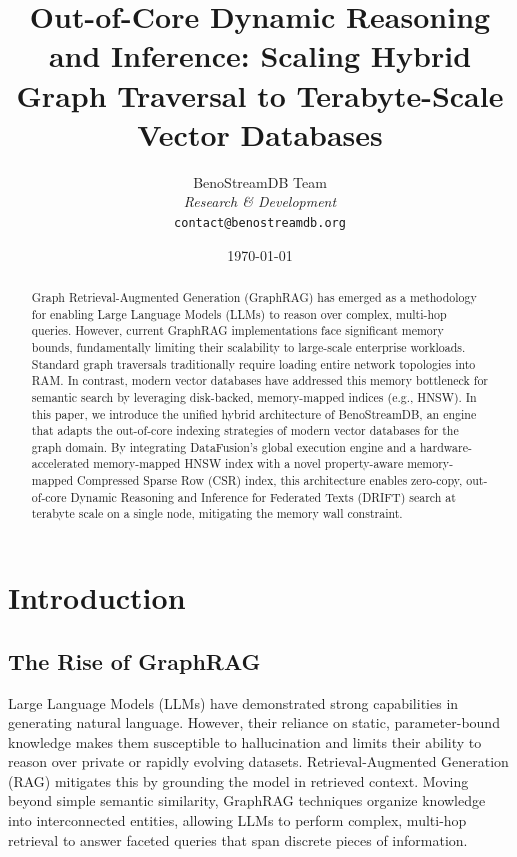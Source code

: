 \documentclass[11pt,twocolumn]{article}
\title{\textbf{Out-of-Core Dynamic Reasoning and Inference: Scaling Hybrid Graph Traversal to Terabyte-Scale Vector Databases}}
\author{
    BenoStreamDB Team \\
    \textit{Research \& Development} \\
    \texttt{contact@benostreamdb.org}
}
\date{\today}
\begin{document}
\maketitle

\begin{abstract}
Graph Retrieval-Augmented Generation (GraphRAG) has emerged as a methodology for enabling Large Language Models (LLMs) to reason over complex, multi-hop queries. However, current GraphRAG implementations face significant memory bounds, fundamentally limiting their scalability to large-scale enterprise workloads. Standard graph traversals traditionally require loading entire network topologies into RAM. In contrast, modern vector databases have addressed this memory bottleneck for semantic search by leveraging disk-backed, memory-mapped indices (e.g., HNSW). In this paper, we introduce the unified hybrid architecture of BenoStreamDB, an engine that adapts the out-of-core indexing strategies of modern vector databases for the graph domain. By integrating DataFusion's global execution engine and a hardware-accelerated memory-mapped HNSW index with a novel property-aware memory-mapped Compressed Sparse Row (CSR) index, this architecture enables zero-copy, out-of-core Dynamic Reasoning and Inference for Federated Texts (DRIFT) search at terabyte scale on a single node, mitigating the memory wall constraint.
\end{abstract}

\section{Introduction}

\subsection{The Rise of GraphRAG}
Large Language Models (LLMs) have demonstrated strong capabilities in generating natural language. However, their reliance on static, parameter-bound knowledge makes them susceptible to hallucination and limits their ability to reason over private or rapidly evolving datasets. Retrieval-Augmented Generation (RAG) mitigates this by grounding the model in retrieved context. Moving beyond simple semantic similarity, GraphRAG techniques organize knowledge into interconnected entities, allowing LLMs to perform complex, multi-hop retrieval to answer faceted queries that span discrete pieces of information.
\end{document}
